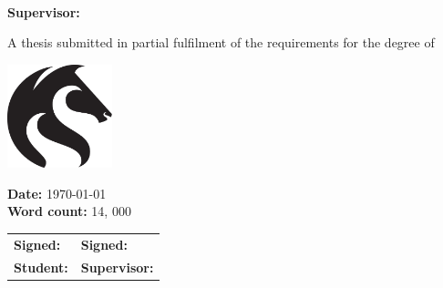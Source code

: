 
\begin{titlepage}
\makeatletter

	\vspace*{\fill}

	{
		\huge{\textbf{\textsf{\@title}}}
		\par
	}

	\vspace{0.25cm}\par
	\begin{center}
		\sffamily
		\LARGE{\textbf{\@author}} \\
		\vspace{0.05cm}\par
		\large{\textbf{Supervisor:} \supervisor}
	\end{center}
	\vspace{0.25cm}\par

	{
		\Large{A thesis submitted in partial fulfilment of the requirements for the degree of \degree}
		\par
	}

	\vspace{0.25cm}\par

	\begin{center}
		\includegraphics[height=3cm]{images/title/uon_logo}
		\vspace{0.25cm}\par
		\Large{\institute}
	\end{center}

	\vspace*{\fill}

	\sffamily
	\textbf{Date:} \today \\
	\textbf{Word count:} 14, 000
	\vspace{0.25cm}\par
	\begin{tabularx}{\textwidth}{@{}XX@{}}
		\textbf{Signed:} \dotfill & \textbf{Signed:} \dotfill \\
		\textbf{Student:} \dotfill & \textbf{Supervisor:} \dotfill \\
	\end{tabularx}

\makeatother
\end{titlepage}
